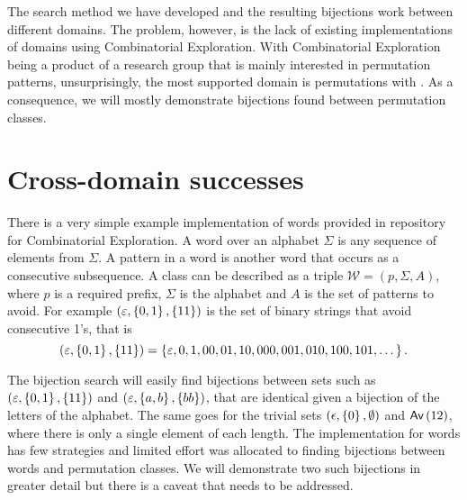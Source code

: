 
\label{ch:results}
The search method we have developed and the resulting bijections work between different domains. The problem, however, is the lack of existing implementations of domains using Combinatorial Exploration. With Combinatorial Exploration being a product of a research group that is mainly interested in permutation patterns, unsurprisingly, the most supported domain is permutations with \tsc{}. As a consequence, we will mostly demonstrate bijections found between permutation classes.

\section{Cross-domain successes}
There is a very simple example implementation of words provided in repository for Combinatorial Exploration. A word over an alphabet $\Sigma$ is any sequence of elements from $\Sigma$. A pattern in a word is another word that occurs as a consecutive subsequence. A class can be described as a triple $\mathcal{W} = (p, \Sigma, A)$, where $p$ is a required prefix, $\Sigma$ is the alphabet and $A$ is the set of patterns to avoid. For example $(\varepsilon, \left\{0,1\right\}, \left\{11\right\})$ is the set of binary strings that avoid consecutive 1's, that is
\[
    (\varepsilon, \left\{0,1\right\}, \left\{11\right\}) = \left\{\varepsilon, 0, 1, 00, 01, 10, 000, 001, 010, 100, 101, \dotsc\right\}.
\]


The bijection search will easily find bijections between sets such as $(\varepsilon, \left\{0,1\right\}, \left\{11\right\})$ and $(\varepsilon, \left\{a,b\right\}, \left\{bb\right\})$, that are identical given a bijection of the letters of the alphabet. The same goes for the trivial sets $(\epsilon, \left\{0\right\}, \emptyset)$ and $\textsf{Av}\left(12\right)$, where there is only a single element of each length. The implementation for words has few strategies and limited effort was allocated to finding bijections between words and permutation classes. We will demonstrate two such bijections in greater detail but there is a caveat that needs to be addressed.


